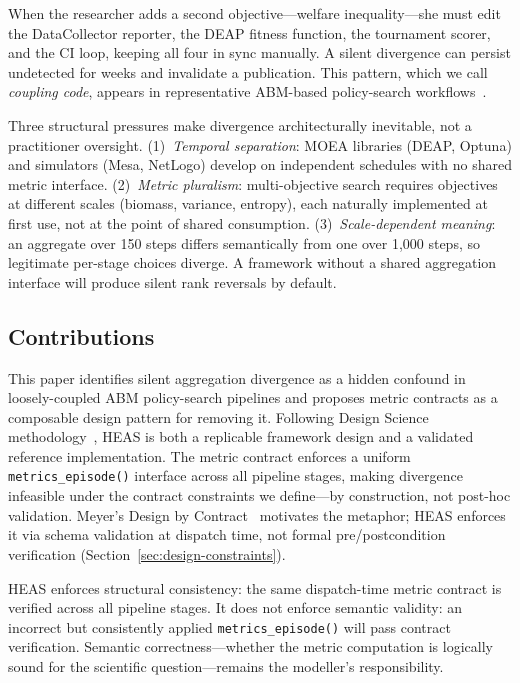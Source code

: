 \documentclass{wscpaperproc}
\begin{document}
When the researcher adds a second objective---welfare inequality---she must edit
the DataCollector reporter, the DEAP fitness function, the tournament scorer, and
the CI loop, keeping all four in sync manually. A silent divergence can persist
undetected for weeks and invalidate a publication. This pattern, which we call
\emph{coupling code}, appears in representative ABM-based policy-search
workflows~\cite{pangallo2019best}.

Three structural pressures make divergence architecturally inevitable, not a
practitioner oversight. (1)~\emph{Temporal separation}: MOEA libraries (DEAP,
Optuna) and simulators (Mesa, NetLogo) develop on independent schedules with no
shared metric interface. (2)~\emph{Metric pluralism}: multi-objective search
requires objectives at different scales (biomass, variance, entropy), each
naturally implemented at first use, not at the point of shared consumption.
(3)~\emph{Scale-dependent meaning}: an aggregate over 150 steps differs
semantically from one over 1,000 steps, so legitimate per-stage choices diverge.
A framework without a shared aggregation interface will produce silent rank
reversals by default.

\subsection{Contributions}
\label{sec:intro-contributions}

This paper identifies silent aggregation divergence as a hidden confound in
loosely-coupled ABM policy-search pipelines and proposes metric contracts as a
composable design pattern for removing it. Following Design Science
methodology~\cite{hevner2004design}, HEAS is both a replicable framework design
and a validated reference implementation. The metric contract enforces a uniform
\texttt{metrics\_episode()} interface across all pipeline stages, making
divergence infeasible under the contract constraints we
define---by construction, not post-hoc validation. Meyer's Design by
Contract~\cite{meyer1997object} motivates the metaphor; HEAS enforces it via
schema validation at dispatch time, not formal pre/postcondition verification
(Section~\ref{sec:design-constraints}).

HEAS enforces structural consistency: the same dispatch-time metric contract is
verified across all pipeline stages. It does not enforce semantic validity: an
incorrect but consistently applied \texttt{metrics\_episode()} will pass contract
verification. Semantic correctness---whether the metric computation is logically
sound for the scientific question---remains the modeller's responsibility.
\end{document}
